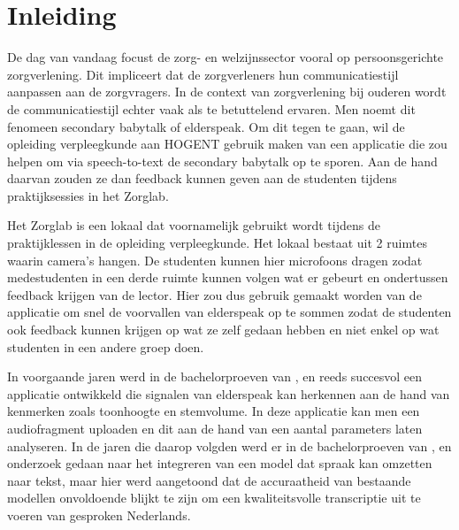 


% 

\section{Inleiding}%
\label{sec:inleiding}

De dag van vandaag focust de zorg- en welzijnssector vooral op persoonsgerichte zorgverlening. Dit impliceert dat de zorgverleners hun communicatiestijl aanpassen aan de zorgvragers. In de context van zorgverlening bij ouderen wordt de communicatiestijl echter vaak als te betuttelend ervaren. Men noemt dit fenomeen secondary babytalk of elderspeak. Om dit tegen te gaan, wil de opleiding verpleegkunde aan HOGENT gebruik maken van een applicatie die zou helpen om via speech-to-text de secondary babytalk op te sporen. Aan de hand daarvan zouden ze dan feedback kunnen geven aan de studenten tijdens praktijksessies in het Zorglab.

Het Zorglab is een lokaal dat voornamelijk gebruikt wordt tijdens de praktijklessen in de opleiding verpleegkunde. Het lokaal bestaat uit 2 ruimtes waarin camera's hangen. De studenten kunnen hier microfoons dragen zodat medestudenten in een derde ruimte kunnen volgen wat er gebeurt en ondertussen feedback krijgen van de lector. Hier zou dus gebruik gemaakt worden van de applicatie om snel de voorvallen van elderspeak op te sommen zodat de studenten ook feedback kunnen krijgen op wat ze zelf gedaan hebben en niet enkel op wat studenten in een andere groep doen.

In voorgaande jaren werd in de bachelorproeven van \textcite{Govaerts2022}, \textcite{Gussem2022} en \textcite{Daems2023} reeds succesvol een applicatie ontwikkeld die signalen van elderspeak kan herkennen aan de hand van kenmerken zoals toonhoogte en stemvolume. In deze applicatie kan men een audiofragment uploaden en dit aan de hand van een aantal parameters laten analyseren. In de jaren die daarop volgden werd er in de bachelorproeven van \textcite{Branden2024}, \textcite{Coetsiers2024} en \textcite{Schryver2024} onderzoek gedaan naar het integreren van een model dat spraak kan omzetten naar tekst, maar hier werd aangetoond dat de accuraatheid van bestaande modellen onvoldoende blijkt te zijn om een kwaliteitsvolle transcriptie uit te voeren van gesproken Nederlands.

